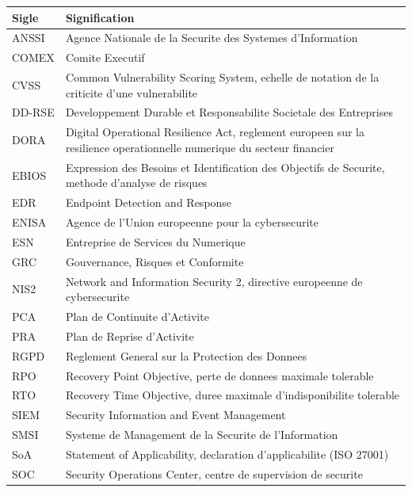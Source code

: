 \documentclass[11pt,a4paper]{article}
\begin{document}
\begin{center}
\small
\begin{longtable}{@{}p{2.6cm}p{10.8cm}@{}}
\toprule
\textbf{Sigle} & \textbf{Signification} \\
\midrule
\endhead
ANSSI & Agence Nationale de la Securite des Systemes d'Information \\
COMEX & Comite Executif \\
CVSS & Common Vulnerability Scoring System, echelle de notation de la criticite d'une vulnerabilite \\
DD-RSE & Developpement Durable et Responsabilite Societale des Entreprises \\
DORA & Digital Operational Resilience Act, reglement europeen sur la resilience operationnelle numerique du secteur financier \\
EBIOS & Expression des Besoins et Identification des Objectifs de Securite, methode d'analyse de risques \\
EDR & Endpoint Detection and Response \\
ENISA & Agence de l'Union europeenne pour la cybersecurite \\
ESN & Entreprise de Services du Numerique \\
GRC & Gouvernance, Risques et Conformite \\
NIS2 & Network and Information Security 2, directive europeenne de cybersecurite \\
PCA & Plan de Continuite d'Activite \\
PRA & Plan de Reprise d'Activite \\
RGPD & Reglement General sur la Protection des Donnees \\
RPO & Recovery Point Objective, perte de donnees maximale tolerable \\
RTO & Recovery Time Objective, duree maximale d'indisponibilite tolerable \\
SIEM & Security Information and Event Management \\
SMSI & Systeme de Management de la Securite de l'Information \\
SoA & Statement of Applicability, declaration d'applicabilite (ISO 27001) \\
SOC & Security Operations Center, centre de supervision de securite \\
\bottomrule
\end{longtable}
\end{center}
\end{document}
